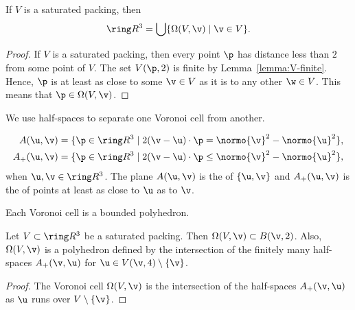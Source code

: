 \begin{cnl}
\figXOHAZWO %

\begin{lemma}\label{lemma:Voronoi-partition}
If $V$ is a saturated packing, then 
\begin{equation}\label{eqn:vor-rn} 
\vecR{3} = \bigcup \setcomp{\Omega(V,\v)}{ \v \in V}.
\end{equation}
\end{lemma}

\begin{proof}
  If $V$ is a saturated packing, then every point $\p$ has distance 
  less than $2$ from some point of $V$.  The set $\Vee{V}(\p,2)$ is finite
  by Lemma~\ref{lemma:V-finite}.  Hence, $\p$ is at least as close to
  some $\v\in V$ as it is to any other $\w\in V$.  This means that
  $\p\in\Omega(V,\v)$.  
\end{proof}

We use half-spaces to separate one Voronoi cell from another.

\begin{definition}\label{def:half-space}
\begin{align*} 
\AA{\u}{\v} &= \setcomp{\p\in\vecR{3} }{ 2(\v-\u)\cdot \p = \normo{\v}^2 - \normo{\u}^2 },\\
\Aplus(\u,\v) &= \setcomp{\p\in\vecR{3} }{ 2(\v-\u)\cdot \p \le \normo{\v}^2 - \normo{\u}^2 },
\end{align*}
when $\u,\v\in\vecR{3}$.  The plane $\AA{\u}{\v}$ is the  of
$\braced{\u,\v}$ and $\Aplus(\u,\v)$ is the  of points at least as
close to $\u$ as to $\v$.  
\end{definition}
%
%

Each Voronoi cell is a bounded polyhedron.

\begin{lemma}
\label{lemma:Voronoi-polyhedron} 
  Let $V\subset\vecR{3}$ be a saturated packing.  Then
  $\Omega(V,\v)\subset \openBall{\v}{2}$.  Also, $\Omega(V,\v)$ is a polyhedron
  defined by the intersection of the finitely many half-spaces
  $\Aplus(\v,\u)$ for $\u\in \Vee{V}(\v,4)\setminus\braced{\v}$.
\end{lemma}

\begin{proof} 
The Voronoi cell $\Omega(V,\v)$ is the
intersection of the half-spaces $\Aplus(\v,\u)$ as $\u$ runs over
$V\setminus \braced{\v}$.


\end{proof}
\end{cnl}
